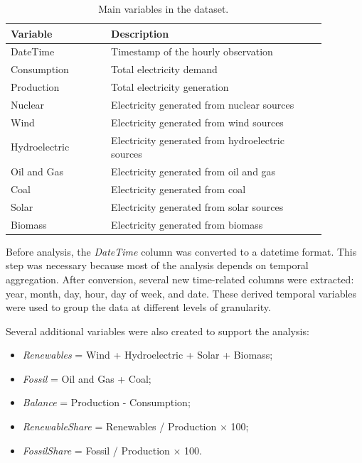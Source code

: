 \documentclass[conference]{IEEEtran}
\begin{document}
\begin{table}[h]
\centering
\caption{Main variables in the dataset.}
\label{tab:variables}
\begin{tabular}{|p{0.28\linewidth}|p{0.60\linewidth}|}
\hline
\textbf{Variable} & \textbf{Description} \\
\hline
DateTime & Timestamp of the hourly observation \\
\hline
Consumption & Total electricity demand \\
\hline
Production & Total electricity generation \\
\hline
Nuclear & Electricity generated from nuclear sources \\
\hline
Wind & Electricity generated from wind sources \\
\hline
Hydroelectric & Electricity generated from hydroelectric sources \\
\hline
Oil and Gas & Electricity generated from oil and gas \\
\hline
Coal & Electricity generated from coal \\
\hline
Solar & Electricity generated from solar sources \\
\hline
Biomass & Electricity generated from biomass \\
\hline
\end{tabular}
\end{table}

Before analysis, the \textit{DateTime} column was converted to a datetime format. This step was necessary because most of the analysis depends on temporal aggregation. After conversion, several new time-related columns were extracted: year, month, day, hour, day of week, and date. These derived temporal variables were used to group the data at different levels of granularity.

Several additional variables were also created to support the analysis:

\begin{itemize}
\item \textit{Renewables} = Wind + Hydroelectric + Solar + Biomass;
\item \textit{Fossil} = Oil and Gas + Coal;
\item \textit{Balance} = Production - Consumption;
\item \textit{RenewableShare} = Renewables / Production $\times$ 100;
\item \textit{FossilShare} = Fossil / Production $\times$ 100.
\end{itemize}
\end{document}
